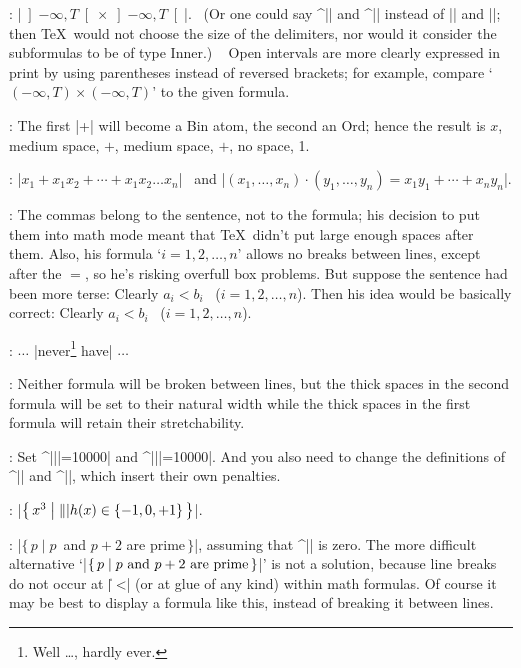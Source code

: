 {{{{{{:
 |$\left]-\infty,T\right[\times\left]-\infty,T\right[$|. \ (Or one could
say ^|\mathopen| and ^|\mathclose| instead of\/ |\left| and |\right|;
then \TeX\ would not choose the size of the delimiters, nor would it consider
the subformulas to be of type Inner.) \
Open intervals are more clearly expressed in print
by using parentheses instead of reversed brackets; for example,
compare `$(-\infty,T)\times(-\infty,T)$' to the given formula.

:
 The first |+| will become a Bin atom, the second an Ord; hence
the result is $x$, medium space, $+$, medium space, $+$, no space, 1.

:
 |$x_1+x_1x_2+\cdots+x_1x_2\ldots x_n$| \ and\hfil\break
|$(x_1,\ldots,x_n)\cdot(y_1,\ldots,y_n)=x_1y_1+\cdots+x_ny_n$|.

:
 The commas belong to the sentence, not to the formula; his
decision to put them into math mode meant that \TeX\ didn't put large
enough spaces after them. Also, his formula `$i=1, 2, \ldots, n$' allows
no breaks between lines, except after the $=$, so he's risking
overfull box problems. But suppose the sentence had been more terse:
\begindisplay
Clearly $a_i<b_i$ \ ($i=1,2,\ldots,n$).
\enddisplay
Then his idea would be basically correct:
\begintt
Clearly $a_i<b_i$ \ ($i=1,2,\ldots,n$).
\endtt

:
 $\ldots$ |never\footnote*{Well \dots, hardly ever.} have| $\ldots$

:
 Neither formula will be broken between lines, but the thick spaces
in the second formula will be set to their natural width while the thick
spaces in the first formula will retain their stretchability.

:
 Set ^|\relpenalty||=10000| and ^|\binoppenalty||=10000|.
And you also need to change the definitions of\/ ^|\bmod| and ^|\pmod|,
which insert their own penalties.

:
 |$\bigl\{\,x^3\bigm|\||h(x)\in\{-1,0,+1\}\,\bigr\}$|.

:
 |$\{\,p\mid p$~and $p+2$ are prime$\,\}$|, assuming that
^|\mathsurround| is zero. The more difficult alternative
`|$\{\,p\mid p\ {\rm and}\ p+2\rm\ are\ prime\,\}$|' is not a solution,
because line breaks do not occur at |\|\] ^^|\space|
(or at glue of any kind) within math formulas. Of course it may be best to
display a formula like this, instead of breaking it between lines.

}}}}}}
